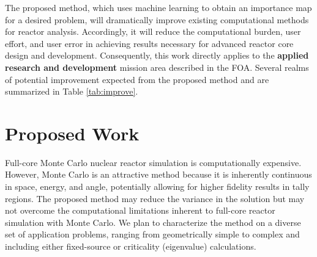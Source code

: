 \documentclass[letterpaper,12pt]{article}
\begin{document}
The proposed method, which uses machine learning to obtain an
importance map for a desired problem, will dramatically improve existing 
computational methods for reactor analysis.  Accordingly, it will
reduce the computational burden, user effort, and user error in 
achieving results necessary for advanced reactor core design and development.
Consequently, this work directly applies to the \textbf{applied research and development}
mission area described in the FOA. Several realms of potential improvement 
expected from the proposed method and are summarized in Table \ref{tab:improve}.



\section{Proposed Work}

Full-core Monte Carlo nuclear reactor simulation is
computationally expensive\cite{martin_challenges_2012}. However, Monte Carlo 
is an attractive method because it is inherently continuous in space, energy, and
angle, potentially allowing for higher fidelity results in tally regions.
The proposed method may reduce the variance in the solution but may not overcome the computational
limitations inherent to full-core reactor simulation with Monte Carlo. We plan to
characterize the method on a diverse set of application problems, ranging from
geometrically simple to complex and including either fixed-source or criticality
(eigenvalue) calculations.
\end{document}
